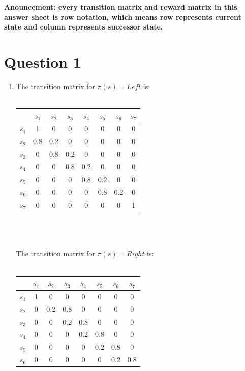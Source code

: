 \documentclass[12pt]{article}
\begin{document}
\maketitle
\textbf{Anouncement: every transition matrix and reward matrix in this answer sheet is row notation, which means row represents current state and column represents successor state.}\\
\section{Question 1}
\begin{enumerate}
\item The transition matrix for $\pi(s) = Left$ is:\\\\
\begin{tabular}{|c|c|c|c|c|c|c|c|}
\hline 
 & $s_1$ & $s_2$ & $s_3$ & $s_4$ & $s_5$ & $s_6$ & $s_7$ \\ 
\hline 
$s_1$ & 1 & 0 & 0 & 0 & 0 & 0 & 0 \\ 
\hline 
$s_2$ & 0.8 & 0.2 & 0 & 0 & 0 & 0 & 0 \\ 
\hline 
$s_3$ & 0 & 0.8 & 0.2 & 0 & 0 & 0 & 0 \\ 
\hline 
$s_4$ & 0 & 0 & 0.8 & 0.2 & 0 & 0 & 0 \\ 
\hline 
$s_5$ & 0 & 0 & 0 & 0.8 & 0.2 & 0 & 0 \\ 
\hline 
$s_6$ & 0 & 0 & 0 & 0 & 0.8 & 0.2 & 0 \\ 
\hline 
$s_7$ & 0 & 0 & 0 & 0 & 0 & 0 & 1 \\ 
\hline 
\end{tabular}\\\\\\
\newpage
The transition matrix for $\pi(s) = Right$ is:\\\\
\begin{tabular}{|c|c|c|c|c|c|c|c|}
\hline 
 & $s_1$ & $s_2$ & $s_3$ & $s_4$ & $s_5$ & $s_6$ & $s_7$ \\ 
\hline 
$s_1$ & 1 & 0 & 0 & 0 & 0 & 0 & 0 \\ 
\hline 
$s_2$ & 0 & 0.2 & 0.8 & 0 & 0 & 0 & 0 \\ 
\hline 
$s_3$ & 0 & 0 & 0.2 & 0.8 & 0 & 0 & 0 \\ 
\hline 
$s_4$ & 0 & 0 & 0 & 0.2 & 0.8 & 0 & 0 \\ 
\hline 
$s_5$ & 0 & 0 & 0 & 0 & 0.2 & 0.8 & 0 \\ 
\hline 
$s_6$ & 0 & 0 & 0 & 0 & 0 & 0.2 & 0.8 \\ 

\end{tabular}
\end{enumerate}
\end{document}
